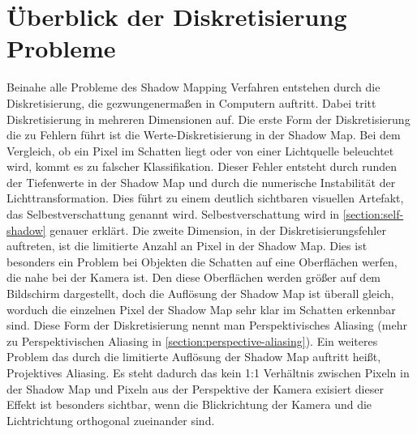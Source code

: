 \section{Überblick der Diskretisierung Probleme}
\label{section:problem-overview}
Beinahe alle Probleme des Shadow Mapping Verfahren entstehen durch die Diskretisierung,
die gezwungenermaßen in Computern auftritt. 
Dabei tritt Diskretisierung in mehreren Dimensionen auf.
\newline \newline
Die erste Form der Diskretisierung die zu Fehlern führt ist die Werte-Diskretisierung 
in der Shadow Map. 
Bei dem Vergleich, ob ein Pixel im Schatten liegt oder von einer Lichtquelle beleuchtet wird,
kommt es zu falscher Klassifikation. Dieser Fehler entsteht durch runden der Tiefenwerte in der Shadow Map und
durch die numerische Instabilität der Lichttransformation.
Dies führt zu einem deutlich sichtbaren visuellen Artefakt, das Selbestverschattung genannt wird.
Selbestverschattung wird in \ref{section:self-shadow} genauer erklärt.
\newline \newline
Die zweite Dimension, in der Diskretisierungsfehler auftreten, ist die limitierte Anzahl 
an Pixel in der Shadow Map.
Dies ist besonders ein Problem bei Objekten die Schatten auf eine Oberflächen werfen, die nahe bei der Kamera ist.
Den diese Oberflächen werden größer auf dem Bildschirm dargestellt, doch die Auflösung der Shadow Map ist 
überall gleich, worduch die einzelnen Pixel der Shadow Map sehr klar im Schatten erkennbar sind.
Diese Form der Diskretisierung nennt man Perspektivisches Aliasing (mehr zu Perspektivischen Aliasing in \ref{section:perspective-aliasing}). 
Ein weiteres Problem das durch die limitierte Auflösung der Shadow Map auftritt heißt,
Projektives Aliasing. 
Es steht dadurch das kein 1:1 Verhältnis zwischen Pixeln in der Shadow Map und 
Pixeln aus der Perspektive der Kamera exisiert dieser Effekt ist besonders
sichtbar, wenn die Blickrichtung der Kamera und die Lichtrichtung orthogonal zueinander sind.

